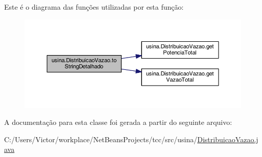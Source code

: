 Este é o diagrama das funções utilizadas por esta função\-:
\nopagebreak
\begin{figure}[H]
\begin{center}
\leavevmode
\includegraphics[width=350pt]{classusina_1_1_distribuicao_vazao_a3fe3a91243c236757535a001afaf2aa3_cgraph}
\end{center}
\end{figure}




A documentação para esta classe foi gerada a partir do seguinte arquivo\-:\begin{DoxyCompactItemize}
\item 
C\-:/\-Users/\-Victor/workplace/\-Net\-Beans\-Projects/tcc/src/usina/\hyperlink{_distribuicao_vazao_8java}{Distribuicao\-Vazao.\-java}\end{DoxyCompactItemize}
